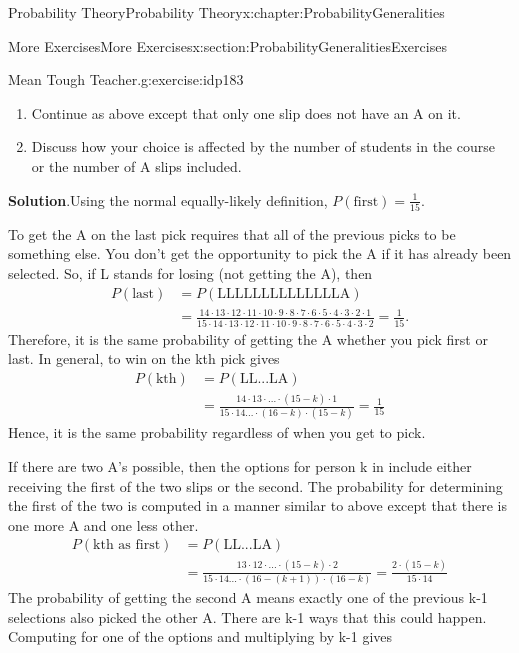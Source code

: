 \documentclass[oneside,10pt,]{book}
\newcommand{\blocktitlefont}{\relax}
\numberwithin{equation}{section}
\begin{document}
\begin{chapterptx}{Probability Theory}{}{Probability Theory}{}{}{x:chapter:ProbabilityGeneralities}
\begin{sectionptx}{More Exercises}{}{More Exercises}{}{}{x:section:ProbabilityGeneralitiesExercises}
\begin{inlineexercise}{Mean Tough Teacher.}{g:exercise:idp183}
\begin{enumerate}
\item{}Continue as above except that only one slip does not have an A on it.%
\item{}Discuss how your choice is affected by the number of students in the course or the number of A slips included.%
\end{enumerate}
%
\par\smallskip%
\noindent\textbf{\blocktitlefont Solution}.\hypertarget{g:solution:idp184}{}\quad{}Using the normal equally-likely definition, \(P(\text{first}) = \frac{1}{15}\).%
\par
To get the A on the last pick requires that all of the previous picks to be something else. You don't get the opportunity to pick the A if it has already been selected. So, if L stands for losing (not getting the A), then%
\begin{align*}
P(\text{last}) & = P(\text{LLLLLLLLLLLLLLA}) \\
& = \frac{14 \cdot 13 \cdot 12 \cdot 11 \cdot 10 \cdot 9  \cdot 8  \cdot 7  \cdot 6  \cdot 5  \cdot 4  \cdot 3 \cdot 2  \cdot 1}{15 \cdot 14 \cdot 13 \cdot 12 \cdot 11 \cdot 10 \cdot 9 \cdot 8 \cdot 7 \cdot 6 \cdot 5 \cdot 4 \cdot 3 \cdot 2} = \frac{1}{15}.
\end{align*}
Therefore, it is the same probability of getting the A whether you pick first or last.  In general, to win on the kth pick gives%
\begin{align*}
P(\text{kth}) & = P(\text{LL...LA})\\
& = \frac{14 \cdot 13 \cdot ... \cdot (15-k) \cdot 1}{15 \cdot 14 ... \cdot (16-k) \cdot (15-k)} = \frac{1}{15}
\end{align*}
Hence, it is the same probability regardless of when you get to pick.%
\par
If there are two A's possible, then the options for person k in include either receiving the first of the two slips or the second. The probability for determining the first of the two is computed in a manner similar to above except that there is one more A and one less other.%
\begin{align*}
P(\text{kth as first}) & = P(\text{LL...LA})\\
& = \frac{13 \cdot 12 \cdot ... \cdot (15-k)  \cdot 2}{15 \cdot 14 ... \cdot (16-(k+1)) \cdot (16-k)} = \frac{2 \cdot (15-k)}{15 \cdot 14}
\end{align*}
The probability of getting the second A means exactly one of the previous k-1 selections also picked the other A. There are k-1 ways that this could happen. Computing for one of the options and multiplying by k-1 gives%

\end{inlineexercise}
\end{sectionptx}
\end{chapterptx}
\end{document}
